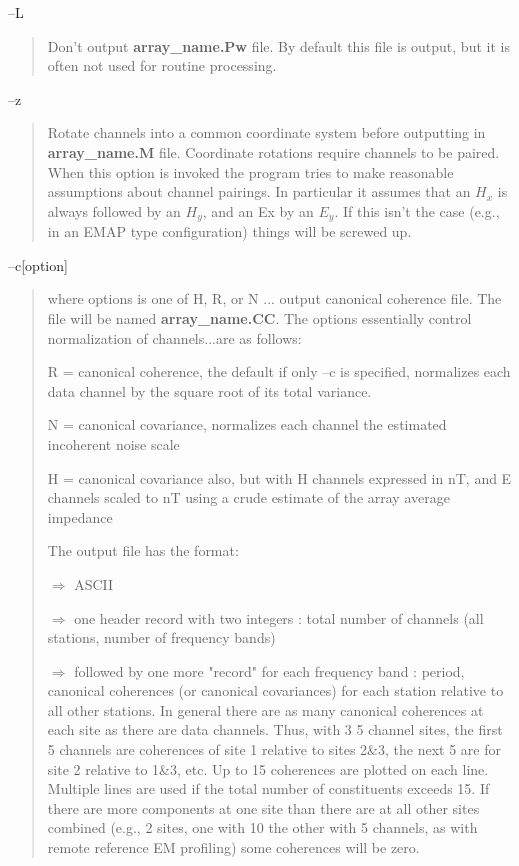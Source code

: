 --L
\begin{quote}
Don't output {\bf array\_name.Pw} file. 
By default this file is output, but it is often
not used for routine processing.
\end{quote}

--z
\begin{quote}
Rotate channels into a common coordinate system before outputting in 
{\bf array\_name.M} file.
Coordinate rotations require channels to be paired.  When this option is invoked
the program tries to make reasonable assumptions about channel pairings.   In particular
it assumes that an $H_x$ is always followed by an $H_y$, and an Ex by an $E_y$.  If this isn't
the case (e.g., in an EMAP type configuration) things will be screwed up.
\end{quote}

--c[option]
\begin{quote}
where options is one of H, R, or N ... output canonical coherence
file.  The file will be named {\bf array\_name.CC}.  The options essentially
control normalization of channels...are as follows:

R = canonical coherence, the default if only --c is specified, normalizes
each data channel by the square root of its total variance.

N = canonical covariance, normalizes each channel the estimated 
incoherent noise scale

H = canonical covariance also, but with H channels expressed in nT, and
E channels scaled to nT using a crude estimate of the array average impedance

The output file has the format:

$\Longrightarrow$  ASCII

$\Longrightarrow$ one header record with two integers : total number of channels (all stations,
number of frequency bands)

$\Longrightarrow$ followed by one more "record" for each frequency band : period, canonical coherences
(or canonical covariances) for each station relative to all other stations.
In general there are as many canonical coherences at each site as there are
data channels.  Thus, with 3 5 channel sites, the first 5 channels are coherences
of site 1 relative to sites 2\&3, the next 5 are for site 2 relative to 1\&3, etc.
Up to 15 coherences are plotted on each line.  Multiple lines are used if the
total number of constituents exceeds 15.  If there are more components at one
site than there are at all other sites combined (e.g., 2 sites, one with 10 the
other with 5 channels, as with remote reference EM profiling) some coherences
will be zero.
\end{quote}

